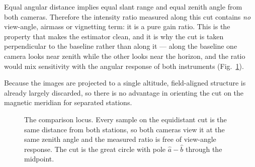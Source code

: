 \documentclass[11pt,a4paper]{article}
\begin{document}
Equal angular distance implies equal slant range and equal zenith angle from
both cameras. Therefore the intensity ratio measured along this cut contains
\emph{no} view-angle, airmass or vignetting term: it is a pure gain ratio. This
is the property that makes the estimator clean, and it is why the cut is taken
perpendicular to the baseline rather than along it --- along the baseline one
camera looks near zenith while the other looks near the horizon, and the ratio
would mix sensitivity with the angular response of both instruments
(Fig.~\ref{fig:geometry}).

Because the images are projected to a single altitude, field-aligned structure
is already largely discarded, so there is no advantage in orienting the cut on
the magnetic meridian for separated stations.

\begin{figure}[t]
\centering
{}
\caption{The comparison locus. Every sample on the equidistant cut is the same
distance from both stations, so both cameras view it at the same zenith angle
and the measured ratio is free of view-angle response. The cut is the great
circle with pole $\hat a-\hat b$ through the midpoint.}
\label{fig:geometry}
\end{figure}
\end{document}
